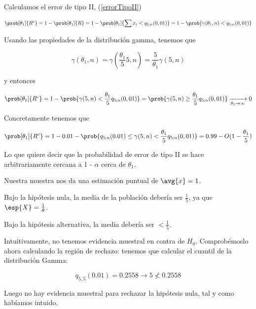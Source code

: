 \begin{problem}[1]
\spart Calculamos el error de tipo II, (\ref{errorTipoII})

\[
\prob[\theta_1]{R^c} =
1 - \prob[\theta_1]{R} =
1 - \prob[\theta_1]{\sum x_i < q_{5; n}(0,01)} =
1 - \prob{\gamma(\theta_1, n) < q_{5; n}(0,01)}
\]

Usando las propiedades de la distribución gamma, tenemos que

\[
\gamma(\theta_1, n) =
\gamma\left(\frac{\theta_1}{5}5, n\right) =
\frac{5}{\theta_1}\gamma(5, n)
\]

y entonces

\[
\prob[\theta_1]{R^c} =
1 - \prob{\gamma(5, n) < \frac{\theta_1}{5}q_{5; n}(0,01)} =
\prob{\gamma(5, n)\geq \frac{\theta_1}{5}q_{5; n} (0,01)}
\xrightarrow[\theta_1 \to \infty]{} 0
\]

Concretamente tenemos que

\[
\prob[\theta_1]{R^c} =
1 - 0.01 - \prob{q_{5; n}(0.01) \leq \gamma(5, n) < \frac{\theta_1}{5}q_{5; n} (0,01)} =
0.99 - O(1 - \frac{\theta_1}{5})
\]

Lo que quiere decir que la probabilidad de error de tipo II se hace arbitrariamente cercana a 1 - $\alpha$ cerca de $\theta_1$.

\spart Nuestra muestra nos da una estimación puntual de $\avg{x} = 1$.

\noindent Bajo la hipótesis nula, la media de la población debería ser $\frac{1}{5}$, ya que $\esp{X} = \frac{1}{\theta}$.

\noindent Bajo la hipótesis alternativa, la media debería ser $ < \frac{1}{5}$.

Intuitivamente, no tenemos evidencia muestral en contra de $H_0$. Comprobémoslo ahora calculando la región de rechazo:
tenemos que calcular el cuantil de la distribución Gamma:

\[ q_{5, 5}(0.01) = 0.2558 \rightarrow 5 \nless 0.2558 \]

Luego no hay evidencia muestral para rechazar la hipótesis nula, tal y como habíamos intuido.

\end{problem}


